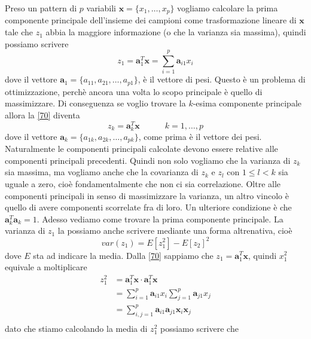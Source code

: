 \noindent Preso un pattern di $p$ variabili $\mathbf{x} = \{x_1, \dots, x_p\}$ vogliamo calcolare la prima componente principale dell'insieme dei campioni come trasformazione lineare di $\mathbf{x}$ tale che $z_1$ abbia la maggiore informazione (o che la varianza sia massima), quindi possiamo scrivere
\begin{equation}\label{70}
z_1 = \mathbf{a}_1^T \mathbf{x} = \sum_{i=1}^p \mathbf{a}_{i1} x_i
\end{equation}
dove il vettore $\mathbf{a}_1 = \{ a_{11}, a_{21}, \dots, a_{p1}\}$, è il vettore di pesi. 
Questo è un problema di ottimizzazione, perchè ancora una volta lo scopo principale è quello di massimizzare. Di conseguenza se voglio trovare la $k$-esima componente principale allora la \ref{70} diventa
\begin{equation}
z_k = \mathbf{a}_k^T \mathbf{x} \quad \quad \quad k=1, \dots, p
\end{equation}
dove il vettore $\mathbf{a}_k = \{ a_{1k}, a_{2k}, \dots, a_{pk} \}$, come prima è il vettore dei pesi.
Naturalmente le componenti principali calcolate devono essere relative alle componenti principali precedenti. Quindi non solo vogliamo che la varianza di $z_k$ sia massima, ma vogliamo anche che la covarianza di $z_k$ e $z_l$ con $1 \leq l < k$ sia uguale a zero, cioè fondamentalmente che non ci sia correlazione. Oltre alle componenti principali in senso di massimizzare la varianza, un altro vincolo è quello di avere componenti scorrelate fra di loro. Un ulteriore condizione è che $\mathbf{a}_k^T \mathbf{a}_k  =1 $. Adesso vediamo come trovare la prima componente principale. La varianza di $z_1$ la possiamo anche scrivere mediante una forma altrenativa, cioè
\begin{equation}\label{72}
var(z_1) = E[z_1^2] - E[z_2]^2
\end{equation}
dove $E$ sta ad indicare la media. Dalla \ref{70} sappiamo che $z_1 = \mathbf{a}_1^T \mathbf{x}$, quindi $x_1^2$ equivale a moltiplicare
\begin{equation}
\begin{split}
z_1^2 &= \mathbf{a}_1^T\mathbf{x} \cdot \mathbf{a}_1^T\mathbf{x}\\
&= \sum_{i=1}^p \mathbf{a}_{i1} x_i \sum_{j=1}^p \mathbf{a}_{j1} x_j\\
&= \sum_{i,j=1}^p \mathbf{a}_{i1} \mathbf{a}_{j1} \mathbf{x}_i \mathbf{x}_j\\
\end{split}
\end{equation}
dato che stiamo calcolando la media di $z_1^2$ possiamo scrivere che

